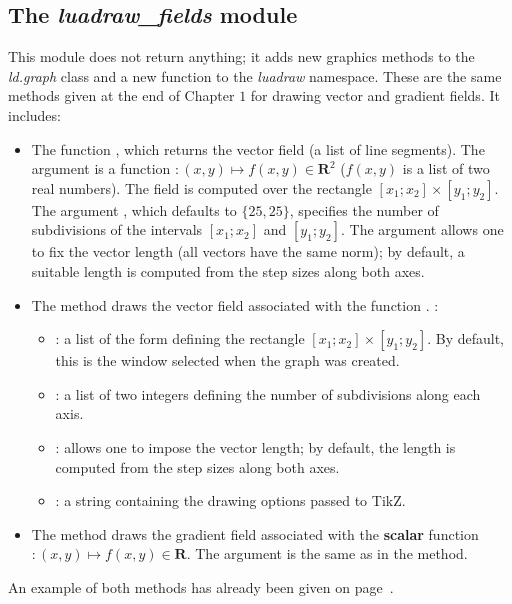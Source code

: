 \subsection{The \emph{luadraw\_fields} module}

This module does not return anything; it adds new graphics methods to the \emph{ld.graph} class and a new function to the \emph{luadraw} namespace. These are the same methods given at the end of Chapter $1$ for drawing vector and gradient fields. It includes:

\begin{itemize}
    \item The function , which returns the vector field (a list of line segments). The argument  is a function \(\colon (x,y)\mapsto f(x,y)\in\mathbf{R}^2\) (\(f(x,y)\) is a list of two real numbers). The field is computed over the rectangle \([x_1;x_2]\times[y_1;y_2]\). The argument , which defaults to $\{25,25\}$, specifies the number of subdivisions of the intervals \([x_1;x_2]\) and \([y_1;y_2]\). The argument  allows one to fix the vector length (all vectors have the same norm); by default, a suitable length is computed from the step sizes along both axes.
    
    \item The method  draws the vector field associated with the function . \writeoptions:
        \begin{itemize}
            \item {}: a list of the form  defining the rectangle \([x_1;x_2]\times[y_1;y_2]\). By default, this is the window selected when the graph was created.
            \item {}: a list of two integers defining the number of subdivisions along each axis.
            \item {}: allows one to impose the vector length; by default, the length is computed from the step sizes along both axes.
            \item {}: a string containing the drawing options passed to TikZ.
        \end{itemize}
        
    \item The method  draws the gradient field associated with the \textbf{scalar} function \(\colon (x,y)\mapsto f(x,y)\in\mathbf{R}\). The argument  is the same as in the  method.
\end{itemize}

An example of both methods has already been given on page~\pageref{fields}.
